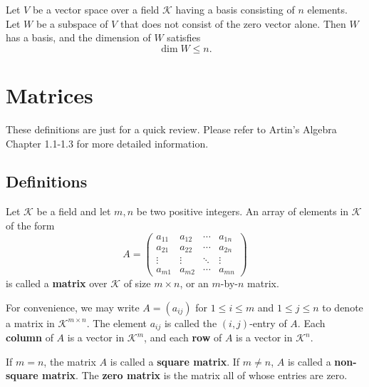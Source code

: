 \documentclass{ctexart}
\begin{document}
	\begin{mythm}
		Let $V$ be a vector space over a field $\mathcal{K}$ having a basis consisting of $n$ elements.  
		Let $W$ be a subspace of $V$ that does not consist of the zero vector alone.  
		Then $W$ has a basis, and the dimension of $W$ satisfies
		\[
		\dim W \leq n.
		\]
	\end{mythm}
	
	\newpage
	\section{Matrices}
	
	These definitions are just for a quick review. Please refer to Artin's Algebra Chapter 1.1-1.3 for more detailed information.
	
	\subsection{Definitions}
	
	\begin{mydef}
		Let $\mathcal{K}$ be a field and let $m, n$ be two positive integers.  
		An array of elements in $\mathcal{K}$ of the form
		\[
		A =
		\begin{pmatrix}
			a_{11} & a_{12} & \cdots & a_{1n} \\
			a_{21} & a_{22} & \cdots & a_{2n} \\
			\vdots & \vdots & \ddots & \vdots \\
			a_{m1} & a_{m2} & \cdots & a_{mn}
		\end{pmatrix}
		\]
		is called a \textbf{matrix} over $\mathcal{K}$ of size $m \times n$, or an $m$-by-$n$ matrix.
	\end{mydef}
	
	\begin{mydef}
		For convenience, we may write $A = (a_{ij})$ for $1 \leq i \leq m$ and $1 \leq j \leq n$ to denote a matrix in $\mathcal{K}^{m \times n}$.  
		The element $a_{ij}$ is called the $(i,j)$-entry of $A$.  
		Each \textbf{column} of $A$ is a vector in $\mathcal{K}^m$, and each \textbf{row} of $A$ is a vector in $\mathcal{K}^n$.
	\end{mydef}
	
	
	\begin{mydef}
		If $m = n$, the matrix $A$ is called a \textbf{square matrix}.  
		If $m \neq n$, $A$ is called a \textbf{non-square matrix}.  
		The \textbf{zero matrix} is the matrix all of whose entries are zero.
	\end{mydef}
	
\end{document}
